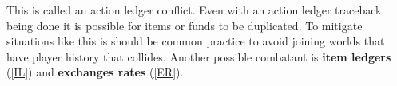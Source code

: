 \documentclass[runningheads,a4paper]{llncs}
\begin{document}
This is called an action ledger conflict. Even with an action ledger traceback being done it is possible for items or funds to be duplicated. To mitigate situations like this is should be common practice to avoid joining worlds that have player history that collides. Another possible combatant is \textbf{item ledgers} (\ref{IL}) and \textbf{exchanges rates} (\ref{ER}).
\end{document}
